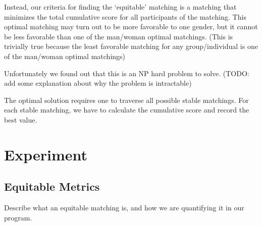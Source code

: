 \documentclass[a4paper]{article}
\begin{document}
Instead, our criteria for finding the `equitable' matching is a matching that minimizes the total cumulative score for all participants of the matching. This optimal matching may turn out to be more favorable to one gender, but it cannot be less favorable than one of the man/woman optimal matchings. (This is trivially true because the least favorable matching for any group/individual is one of the man/woman optimal matchings)

Unfortunately we found out that this is an NP hard problem to solve. (TODO: add some explanation about why the problem is intractable)

The optimal solution requires one to traverse all possible stable matchings. For each stable matching, we have to calculate the cumulative score and record the best value.

\section{Experiment}
\subsection{Equitable Metrics}
Describe what an equitable matching is, and how we are quantifying it in our program.
\end{document}
